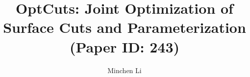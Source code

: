 \documentclass[acmtog, review, anonymous]{acmart}
\begin{document}
\title{OptCuts: Joint Optimization of Surface Cuts and Parameterization
\\ {\small (Paper ID: 243)}
} 

\author{Minchen Li}

\renewcommand\shortauthors{Li, M. et al}

\newcommand{\minchen}[1]{\textcolor{blue}{\textbf{Minchen: #1}}}
\newcommand{\justin}[1]{\textcolor{red}{\textbf{Justin: #1}}}
\newcommand{\alla}[1]{\textcolor{orange}{\textbf{Alla: #1}}}
\newcommand{\danny}[1]{\textcolor{purple}{\textbf{Danny: #1}}}
\newcommand{\vova}[1]{\textcolor{green}{\textbf{Vova: #1}}}
\end{document}
